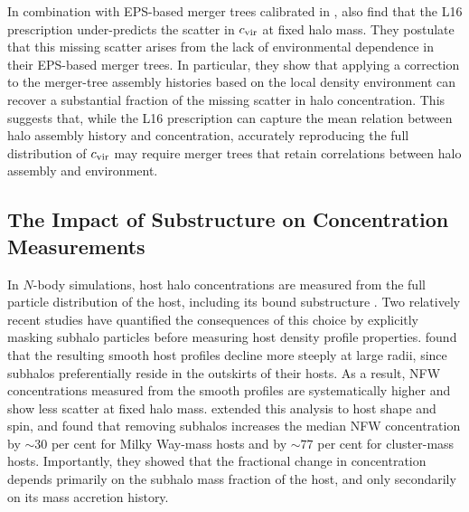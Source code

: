 \documentclass[twocolumn,apj,numberedappendix,twocolappendix,iop]{openjournal}
\begin{document}
  In combination with EPS-based merger trees calibrated in \cite{Benson.17}, \cite{Benson.etal.19} also find that the L16 prescription under-predicts the scatter in $c_{\rm vir}$ at fixed halo mass. They postulate that this missing scatter arises from the lack of environmental dependence in their EPS-based merger trees. In particular, they show that applying a correction to the merger-tree assembly histories based on the local density environment can recover a substantial fraction of the missing scatter in halo concentration. This suggests that, while the L16 prescription can capture the mean relation between halo assembly history and concentration, accurately reproducing the full distribution of $c_{\rm vir}$ may require merger trees that retain correlations between halo assembly and environment. 

\subsection{The Impact of Substructure on Concentration Measurements}
\label{sec:cvir_measurments}

In $N$-body simulations, host halo concentrations are measured from the full particle distribution of the host, including its bound substructure \citep{Behroozi.etal.13a, Prada.etal.12, Wang.etal.20}. Two relatively recent studies have quantified the consequences of this choice by explicitly masking subhalo particles before measuring host density profile properties. \citet{Fielder.etal.20} found that the resulting smooth host profiles decline more steeply at large radii, since subhalos preferentially reside in the outskirts of their hosts. As a result, NFW concentrations measured from the smooth profiles are systematically higher and show less scatter at fixed halo mass. \citet{Mezini.etal.23} extended this analysis to host shape and spin, and found that removing subhalos increases the median NFW concentration by $\sim 30$ per cent for Milky Way-mass hosts and by $\sim 77$ per cent for cluster-mass hosts. Importantly, they showed that the fractional change in concentration depends primarily on the subhalo mass fraction of the host, and only secondarily on its mass accretion history.
\end{document}
